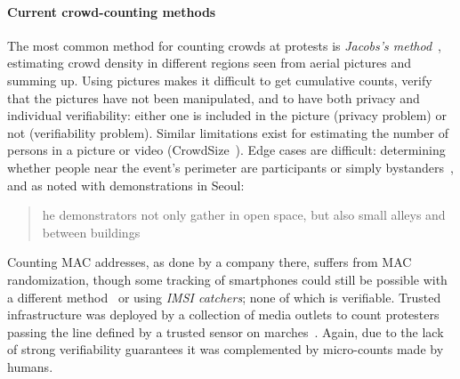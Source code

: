 \paragraph{Current crowd-counting methods}

The most common method for counting crowds at protests is \emph{Jacobs's method}~\cite{2016DemonstrationsInSeoul,BBCHowToCountProtestNumbers}, estimating crowd density in different regions seen from aerial pictures and summing up.  Using pictures makes it difficult to get cumulative counts, verify that the pictures have not been manipulated, and to have both privacy and individual verifiability: either one is included in the picture (privacy problem) or not (verifiability problem). Similar limitations exist for estimating the number of persons in a picture or video (\eg CrowdSize~\cite{CrowdSize}).
Edge cases are difficult: determining whether people near the event's perimeter are participants or 
simply bystanders~\cite{HowToEstimateCrowdSize}, and as noted with demonstrations in Seoul:
\blockcquote{2016DemonstrationsInSeoul}{%
  he demonstrators not only gather in open space, but also small alleys and between buildings%
}. Counting MAC addresses, as done by a company there, suffers from MAC randomization, though some tracking of smartphones could still be possible with a different method~\cite{WhyMACRandomizationIsNotEnough} or using \emph{IMSI catchers}; none of which is verifiable.
Trusted infrastructure was deployed by a collection of media outlets to count protesters passing the line defined by a trusted sensor on marches~\cite{LeMondeProtestingSolution}. Again, due to the lack of
strong verifiability guarantees it was complemented by micro-counts made by humans. %


